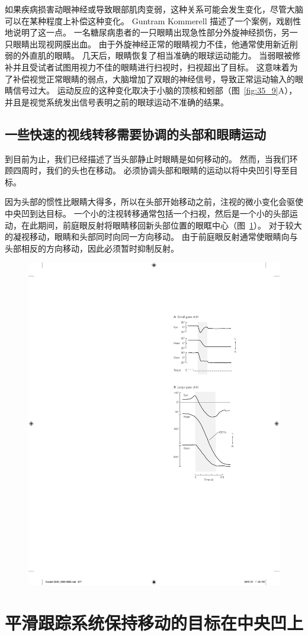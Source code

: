 如果疾病损害动眼神经或导致眼部肌肉变弱，这种关系可能会发生变化，尽管大脑可以在某种程度上补偿这种变化。
Guntram Kommerell 描述了一个案例，戏剧性地说明了这一点。
一名糖尿病患者的一只眼睛出现急性部分外旋神经损伤，另一只眼睛出现视网膜出血。
由于外旋神经正常的眼睛视力不佳，他通常使用新近削弱的外直肌的眼睛。
几天后，眼睛恢复了相当准确的眼球运动能力。
当弱眼被修补并且受试者试图用视力不佳的眼睛进行扫视时，扫视超出了目标。
这意味着为了补偿视觉正常眼睛的弱点，大脑增加了双眼的神经信号，导致正常运动输入的眼睛信号过大。
运动反应的这种变化取决于小脑的顶核和蚓部（图~\ref{fig:35_9}A），并且是视觉系统发出信号表明之前的眼球运动不准确的结果。



\subsection{一些快速的视线转移需要协调的头部和眼睛运动}

到目前为止，我们已经描述了当头部静止时眼睛是如何移动的。
然而，当我们环顾四周时，我们的头也在移动。
必须协调头部和眼睛的运动以将中央凹引导至目标。


因为头部的惯性比眼睛大得多，所以在头部开始移动之前，注视的微小变化会驱使中央凹到达目标。
一个小的注视转移通常包括一个扫视，然后是一个小的头部运动，在此期间，前庭眼反射将眼睛移回新头部位置的眼眶中心（图~\ref{fig:35_14}）。
对于较大的凝视移动，眼睛和头部同时向同一方向移动。
由于前庭眼反射通常使眼睛向与头部相反的方向移动，因此必须暂时抑制反射。


\begin{figure}[htbp]
	\centering
	\includegraphics[width=0.4\linewidth]{chap35/fig_35_14}
	\caption{}
	\label{fig:35_14}
\end{figure}



\section{平滑跟踪系统保持移动的目标在中央凹上}

